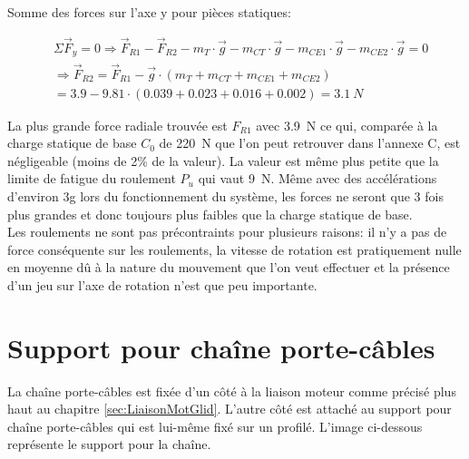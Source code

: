 Somme des forces sur l'axe y pour pièces statiques:

\begin{equation}
    \begin{aligned}
         & \Sigma \vec{F}_y = 0 \Rightarrow \vec{F}_{R1} - \vec{F}_{R2} - m_T \cdot \vec{g} - m_{CT} \cdot \vec{g} - m_{CE1} \cdot \vec{g} - m_{CE2} \cdot \vec{g} = 0 \\
         & \Rightarrow \vec{F}_{R2} = \vec{F}_{R1} - \vec{g} \cdot (m_T + m_{CT} + m_{CE1} + m_{CE2})                                                                  \\
         & = 3.9 - 9.81 \cdot (0.039 + 0.023 + 0.016 +0.002) = 3.1~N
    \end{aligned}
\end{equation}

La plus grande force radiale trouvée est $F_{R1}$ avec 3.9~N ce qui, comparée à la charge statique de base $C_0$ de 220~N que l'on peut retrouver dans
l'annexe C, est négligeable (moins de 2\% de la valeur). La valeur est même plus petite que la limite de fatigue du roulement $P_u$ qui vaut 9~N.
Même avec des accélérations d'environ 3g lors du fonctionnement du système, les forces ne seront que 3 fois plus grandes et donc toujours
plus faibles que la charge statique de base.\\

Les roulements ne sont pas précontraints pour plusieurs raisons: il n'y a pas de force conséquente sur les roulements, la vitesse de rotation
est pratiquement nulle en moyenne dû à la nature du mouvement que l'on veut effectuer et la présence d'un jeu sur l'axe de rotation n'est que
peu importante.

\section{Support pour chaîne porte-câbles}\label{sec:SupChainCable}
La chaîne porte-câbles est fixée d'un côté à la liaison moteur comme précisé plus haut au chapitre \ref{sec:LiaisonMotGlid}. L'autre côté est
attaché au support pour chaîne porte-câbles qui est lui-même fixé sur un profilé. L'image ci-dessous représente le support pour la chaîne.

